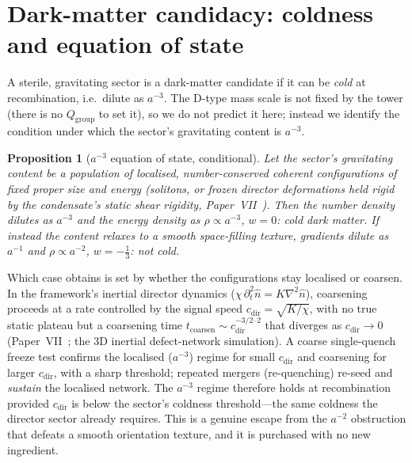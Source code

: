 \documentclass[11pt,a4paper]{article}
\newtheorem{proposition}[theorem]{Proposition}
\theoremstyle{definition}\newtheorem{definition}[theorem]{Definition}
\theoremstyle{remark}
\newcommand{\Qgr}{Q_{\mathrm{group}}}
\newcommand{\cdir}{c_{\mathrm{dir}}}
\begin{document}
\section{Dark-matter candidacy: coldness and equation of state}
\label{P21:sec:dm}
A sterile, gravitating sector is a dark-matter candidate if it can be
\emph{cold} at recombination, i.e.\ dilute as $a^{-3}$. The D-type mass
scale is not fixed by the tower (there is no $\Qgr$ to set it), so we do
not predict it here; instead we identify the condition under which the
sector's gravitating content is $a^{-3}$.

\begin{proposition}[$a^{-3}$ equation of state, conditional]
\label{P21:prop:eos}
Let the sector's gravitating content be a population of localised,
number-conserved coherent configurations of fixed proper size and energy
(solitons, or frozen director deformations held rigid by the condensate's
static shear rigidity, Paper~VII~\cite{Paper7}). Then the number density
dilutes as $a^{-3}$ and the energy density as $\rho\propto a^{-3}$,
$w=0$: cold dark matter. If instead the content relaxes to a smooth
space-filling texture, gradients dilute as $a^{-1}$ and $\rho\propto
a^{-2}$, $w=-\tfrac13$: not cold.
\end{proposition}

\noindent Which case obtains is set by whether the configurations stay
localised or coarsen. In the framework's inertial director dynamics
($\chi\,\partial_t^2\hat n=K\nabla^2\hat n$), coarsening proceeds at a
rate controlled by the signal speed $\cdir=\sqrt{K/\chi}$, with no true
static plateau but a coarsening time $t_{\mathrm{coarsen}}\sim
\cdir^{-3/2\text{--}2}$ that diverges as $\cdir\to0$
(Paper~VII~\cite{Paper7}; the $3$D inertial defect-network simulation).
A coarse single-quench freeze test confirms the localised ($a^{-3}$)
regime for small $\cdir$ and coarsening for larger $\cdir$, with a sharp
threshold; repeated mergers (re-quenching) re-seed and \emph{sustain} the
localised network. The $a^{-3}$ regime therefore holds at recombination
provided $\cdir$ is below the sector's coldness threshold---the same
coldness the director sector already requires. This is a genuine escape
from the $a^{-2}$ obstruction that defeats a smooth orientation texture,
and it is purchased with no new ingredient.

\end{document}
